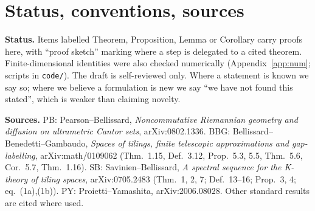 \documentclass[11pt]{article}
\theoremstyle{definition}
\theoremstyle{remark}
\begin{document}
\begin{abstract}
\emph{Continuation algebras.} Continuation classes are Crutchfield's causal states; the continuation algebra is the AF algebra of a ``causal-state Bratteli diagram''. KMS$_\beta$ states correspond to $\beta$-weighted switching rules, the BBG positive-cycle theorem in dimension zero. The neural state is the KMS$_1$ state given by the constant harmonic function. Finite rank gives at most $N$ extremal KMS states, and Birkhoff contraction gives uniqueness at a geometric rate. Simple finite-rank diagrams of rank $\ge2$ realize as one-dimensional FLC tilings with $H^1_{PV}\cong K_0$ of the continuation algebra. The golden-mean causal-state machine gives exactly the Fibonacci tiling.

\emph{Network bridges.} Partial annealing of discarded weight directions is Haar averaging over residual-rotation arrows, and it equals Gaussian heat flow on the activation. Downstream error is an exact positive spectral sum over moment orders. Depth acts on moment orders as a critical Galton--Watson process, with He initialization exactly at criticality.
\end{abstract}

\tableofcontents

\section{Status, conventions, sources}

\textbf{Status.} Items labelled Theorem, Proposition, Lemma or Corollary carry proofs here, with ``proof sketch'' marking where a step is delegated to a cited theorem. Finite-dimensional identities were also checked numerically (Appendix~\ref{app:num}; scripts in \texttt{code/}). The draft is self-reviewed only. Where a statement is known we say so; where we believe a formulation is new we say ``we have not found this stated'', which is weaker than claiming novelty.

\textbf{Sources.} PB: Pearson--Bellissard, \emph{Noncommutative Riemannian geometry and diffusion on ultrametric Cantor sets}, arXiv:0802.1336. BBG: Bellissard--Benedetti--Gambaudo, \emph{Spaces of tilings, finite telescopic approximations and gap-labelling}, arXiv:math/0109062 (Thm.~1.15, Def.~3.12, Prop.~5.3, 5.5, Thm.~5.6, Cor.~5.7, Thm.~1.16). SB: Savinien--Bellissard, \emph{A spectral sequence for the K-theory of tiling spaces}, arXiv:0705.2483 (Thm.~1, 2, 7; Def.~13--16; Prop.~3, 4; eq.~(1a),(1b)). PY: Proietti--Yamashita, arXiv:2006.08028. Other standard results are cited where used.
\end{document}
